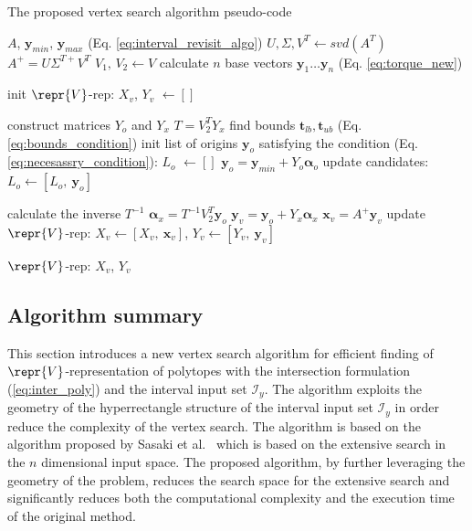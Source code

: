\begin{algorithm}[!b]
\caption{The proposed vertex search algorithm pseudo-code}
\begin{algorithmic}
\REQUIRE $A$, $\bm{y}_{min}$, $\bm{y}_{max}$ (Eq. \ref{eq:interval_revisit_algo}) 
\STATE $U, \Sigma, V^T \leftarrow svd(A^T)$ 
\STATE $A^{+} = U\Sigma^{T+}V^T$
\STATE $V_1,\, V_2  \leftarrow V $
\STATE calculate $n$ base vectors $\bm{y}_1 \dotsc \bm{y}_n$ (Eq. \ref{eq:torque_new})

\STATE init $\repr{V}$-rep: $X_v$, $Y_v$ $\!\leftarrow\! []$

\STATE construct matrices $Y_o$ and $Y_x$
\STATE $T = V_2^TY_x$
\STATE find bounds $\bm{t}_{lb},\bm{t}_{ub}$ (Eq. \ref{eq:bounds_condition})
\STATE init list of origins $\bm{y}_o$ satisfying the condition (Eq. \ref{eq:necesassry_condition}): $L_o$ $\!\leftarrow\! []$ 
\STATE $\bm{y}_o = \bm{y}_{min} +  Y_o\bm{\alpha}_o$ 
\STATE update candidates: $L_o \!\leftarrow\! [L_o,~ \bm{y}_o]$
\ENDIF
\ENDFOR

\STATE calculate the inverse $T^{-1}$
\STATE $\bm{\alpha}_x = T^{-1}V_2^T\bm{y}_o $
\STATE $\bm{y}_{v} = \bm{y}_o + Y_x\bm{\alpha}_x$ 
\STATE $\bm{x}_{v} = A^{+}\bm{y}_{v}$ 
\STATE update $\repr{V}$-rep: ${X}_{v} \!\leftarrow\! [{X}_{v},~ \bm{x}_v ]$, ${Y}_{v} \!\leftarrow\! [{Y}_{v},~ \bm{y}_v ]$ 
\ENDIF
\ENDFOR
\ENDIF


\ENDIF

\ENDFOR
\RETURN $\repr{V}$-rep: $X_v$, $Y_v$

\end{algorithmic}
\label{alg:algo_1}
\end{algorithm}

\subsection{Algorithm summary}
This section introduces a new vertex search algorithm for efficient finding of $\repr{V}$-representation of polytopes with the intersection formulation (\ref{eq:inter_poly}) and the interval input set $\mathcal{I}_y$. The algorithm exploits the geometry of the hyperrectangle structure of the interval input set $\mathcal{I}_y$ in order reduce the complexity of the vertex search. The algorithm is based on the algorithm proposed by Sasaki et al.~\cite{sasaki2011vertex} which is based on the extensive search in the $n$ dimensional input space. The proposed algorithm, by further leveraging the geometry of the problem, reduces the search space for the extensive search and significantly reduces both the computational complexity and the execution time of the original method.

